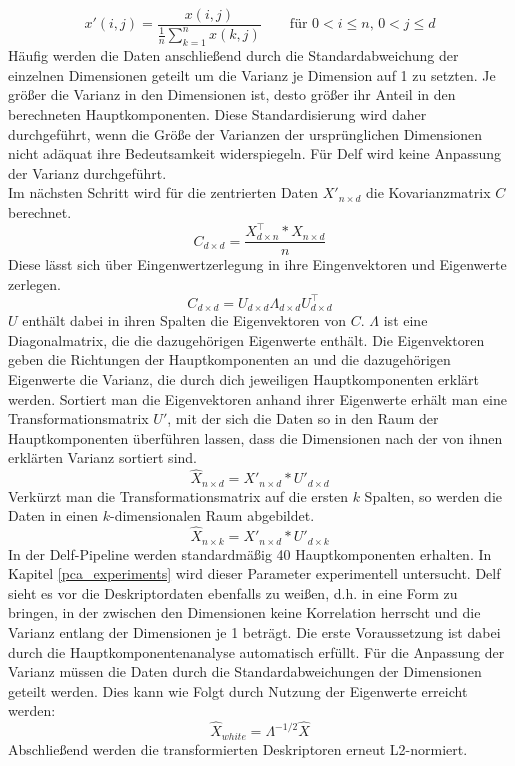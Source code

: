 \begin{equation}
x'(i,j) = \frac{x(i,j)}{\frac{1}{n}\sum_{k=1}^n{x(k,j)}}\qquad \text{für }0<i\leq n\text{, }0<j\leq d
\end{equation}
% 
Häufig werden die Daten anschließend durch die Standardabweichung der einzelnen Dimensionen geteilt um die Varianz je Dimension auf 1 zu setzten. Je größer die Varianz in den Dimensionen ist, desto größer ihr Anteil in den berechneten Hauptkomponenten. Diese Standardisierung wird daher durchgeführt, wenn die Größe der Varianzen der ursprünglichen Dimensionen nicht adäquat ihre Bedeutsamkeit widerspiegeln. Für Delf wird keine Anpassung der Varianz durchgeführt.
%
\\
Im nächsten Schritt wird für die zentrierten Daten $X'_{n \times d}$ die Kovarianzmatrix $C$ berechnet. 
\begin{equation}
C_{d\times d} =  \frac{X^\intercal_{d \times n} * X_{n \times d}}{n}
\end{equation}
Diese lässt sich über Eingenwertzerlegung in ihre Eingenvektoren und Eigenwerte zerlegen.
\begin{equation}
C_{d\times d} = U_{d\times d}\Lambda_{d\times d}U_{d\times d}^\intercal
\end{equation}
$U$ enthält dabei in ihren Spalten die Eigenvektoren von $C$. $\Lambda$ ist eine Diagonalmatrix, die die dazugehörigen Eigenwerte enthält. Die Eigenvektoren geben die Richtungen der Hauptkomponenten an und die dazugehörigen Eigenwerte die Varianz, die durch dich jeweiligen Hauptkomponenten erklärt werden. Sortiert man die Eigenvektoren anhand ihrer Eigenwerte erhält man eine Transformationsmatrix $U'$, mit der sich die Daten so in den Raum der Hauptkomponenten überführen lassen, dass die Dimensionen nach der von ihnen erklärten Varianz sortiert sind. 
\begin{equation}
\hat{X}_{n \times d} = X'_{n \times d} * U'_{d \times d}
\end{equation}
Verkürzt man die Transformationsmatrix auf die ersten $k$ Spalten, so werden die Daten in einen $k$-dimensionalen Raum abgebildet.
\begin{equation}
\hat{X}_{n \times k} = X'_{n \times d} * U'_{d \times k}
\end{equation}
In der Delf-Pipeline werden standardmäßig 40 Hauptkomponenten erhalten. In Kapitel \ref{pca_experiments} wird dieser Parameter experimentell untersucht. 
Delf sieht es vor die Deskriptordaten ebenfalls zu weißen, d.h. in eine Form zu bringen, in der zwischen den Dimensionen keine Korrelation herrscht und die Varianz entlang der Dimensionen je 1 beträgt. Die erste Voraussetzung ist dabei durch die Hauptkomponentenanalyse automatisch erfüllt. Für die Anpassung der Varianz müssen die Daten durch die Standardabweichungen der Dimensionen geteilt werden. Dies kann wie Folgt durch Nutzung der Eigenwerte erreicht werden:
\begin{equation}
\hat{X}_{white} = \Lambda^{-1/2}\hat{X}
\end{equation}
Abschließend werden die transformierten Deskriptoren erneut L2-normiert.